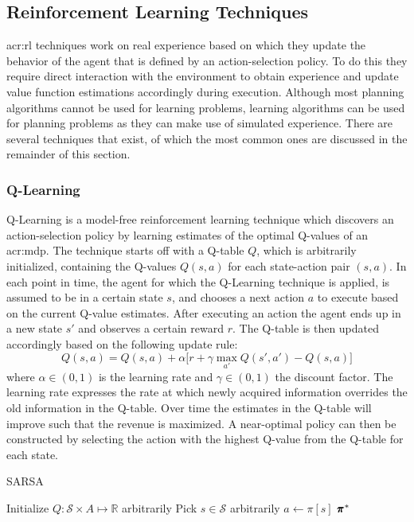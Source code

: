 \subsection{Reinforcement Learning Techniques}
\label{subsec:reinforcement-learning}

\acrfull{acr:rl} techniques work on real experience based on which they update the behavior of the agent that is defined by an action-selection policy. To do this they require direct interaction with the environment to obtain experience and update value function estimations accordingly during execution.
Although most planning algorithms cannot be used for learning problems, learning algorithms can be used for planning problems as they can make use of simulated experience.
There are several techniques that exist, of which the most common ones are discussed in the remainder of this section.

\newpage

\subsubsection{Q-Learning}
\label{sec:q-learning}

Q-Learning is a model-free reinforcement learning technique which discovers an action-selection policy by learning estimates of the optimal Q-values of an \acrshort{acr:mdp}.
The technique starts off with a Q-table $Q$, which is arbitrarily initialized, containing the Q-values $Q(s,a)$ for each state-action pair $(s,a)$.
In each point in time, the agent for which the Q-Learning technique is applied, is assumed to be in a certain state $s$, and chooses a next action $a$ to execute based on the current Q-value estimates.
After executing an action the agent ends up in a new state $s'$ and observes a certain reward $r$.
The Q-table is then updated accordingly based on the following update rule:
\[
Q(s, a) = Q(s, a) + \alpha \Big[r + \gamma \max_{a'} Q(s',a') - Q(s, a)\Big]
\]
where $\alpha \in (0,1)$ is the learning rate and $\gamma \in (0, 1)$ the discount factor.
The learning rate expresses the rate at which newly acquired information overrides the old information in the Q-table.
Over time the estimates in the Q-table will improve such that the revenue is maximized.
A near-optimal policy can then be constructed by selecting the action with the highest Q-value from the Q-table for each state.

% 

\begin{algorithm}
	\caption{SARSA}
	\label{alg:sarsa}
	\begin{algorithmic}[1]
		\State Initialize $Q: \mathcal{S} \times A \mapsto \mathbb{R}$ arbitrarily
		\Repeat
		\State Pick $s \in \mathcal{S}$ arbitrarily
		\State $a \gets \pi[s]$ %
		\Repeat
		\State 
		\State\Return $\pmb{\pi}^*$
	\end{algorithmic}
\end{algorithm}

